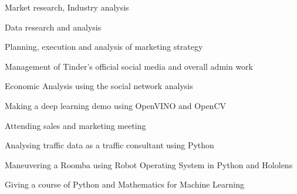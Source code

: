 \begin{tightemize}
\item Market research, Industry analysis
\item Data research and analysis
\item Planning, execution and analysis of marketing strategy
\item Management of Tinder’s official social media and overall admin work
\end{tightemize}
\sectionsep

\begin{tightemize}
\item Economic Analysis using the social network analysis
\end{tightemize}
\sectionsep

\begin{tightemize}
\item Making a deep learning demo using OpenVINO and OpenCV
\item Attending sales and marketing meeting 
\end{tightemize}
\sectionsep

\newpage

\begin{tightemize}
\item Analysing traffic data as a traffic consultant using Python
\end{tightemize}
\sectionsep

\begin{tightemize}
\item Maneuvering a Roomba using Robot Operating System in Python and Hololens
\end{tightemize}
\sectionsep

\begin{tightemize}
\item Giving a course of Python and Mathematics for Machine Learning
\end{tightemize}
\sectionsep


